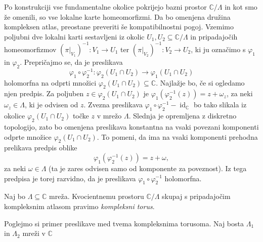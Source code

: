 \documentclass[mat1]{fmfdelo}
\numberwithin{equation}{section}
\newcommand{\C}{\mathbb C}
\newcommand{\om}{\omega}
\newcommand{\inv}{^{-1}}
\newcommand{\torus}{\C/\Lambda}
\DeclareMathOperator{\id}{id}
\theoremstyle{definition}
\begin{document}
Po konstrukciji vse fundamentalne okolice pokrijejo bazni prostor $\torus$ in kot smo že omenili, so vse lokalne karte homeomorfizmi. Da bo omenjena družina kompleksen atlas, preostane preveriti še kompatibilnostni pogoj. Vzemimo poljubni dve lokalni karti sestavljeni iz okolic $U_1, U_2 \subseteq \torus$ in pripadajočih homeomorfizmov $(\pi|_{V_1})\inv : V_1 \to U_1$ ter $(\pi|_{V_2})\inv : V_2 \to U_2$, ki ju označimo s $\varphi_1$ in $\varphi_2$. Prepričajmo se, da je preslikava 
\[
    \varphi_1 \circ \varphi_2\inv : \varphi_2(U_1 \cap U_2) \longrightarrow  \varphi_1(U_1 \cap U_2)
\]
holomorfna na odprti množici $\varphi_2(U_1 \cap U_2) \subseteq \C$. Najlažje bo, če si ogledamo njen predpis. Za poljuben $z \in \varphi_2(U_1 \cap U_2)$ je $\varphi_1(\varphi_2\inv(z)) = z + \om_z$, za neki $\om_z \in \Lambda$, ki je odvisen od $z$. Zvezna preslikava $\varphi_1 \circ \varphi_2\inv - \id_\C$ bo tako slikala iz okolice $\varphi_2(U_1 \cap U_2)$ točke $z$ v mrežo $\Lambda$. Slednja je opremljena z diskretno topologijo, zato bo omenjena preslikava konstantna na vsaki povezani komponenti odprte množice $\varphi_2(U_1 \cap U_2)$. To pomeni, da ima na vsaki komponenti prehodna prelikava predpis oblike 
\[
    \varphi_1(\varphi_2\inv(z)) = z + \om,
\]
za neki $\om \in \Lambda$ (ta je zares odvisen samo od komponente za poveznost). Iz tega predpisa je torej razvidno, da je preslikava $\varphi_1 \circ \varphi_2\inv$ holomorfna. 

\begin{definicija}
    Naj bo $\Lambda \subseteq \C$ mreža. Kvocientnemu prostoru $\torus$ skupaj s pripadajočim kompleksnim atlasom pravimo \emph{kompleksni torus}.  
\end{definicija}

\begin{primer*}
    Poglejmo si primer preslikave med tvema kompleksnima torusoma. Naj bosta $\Lambda_1$ in $\Lambda_2$ mreži v $\C$  
\end{primer*}






\end{document}
